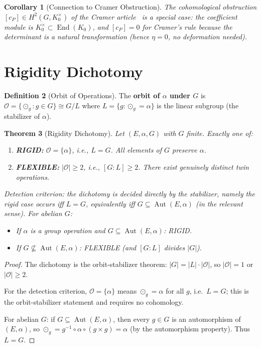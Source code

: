 \documentclass[11pt,twocolumn]{article}
\theoremstyle{plain}\newtheorem{theorem}{Theorem}\newtheorem{proposition}[theorem]{Proposition}\newtheorem{corollary}[theorem]{Corollary}\newtheorem{lemma}[theorem]{Lemma}
\theoremstyle{definition}\newtheorem{definition}[theorem]{Definition}\newtheorem{example}[theorem]{Example}
\theoremstyle{remark}\newtheorem{remark}[theorem]{Remark}
\newcommand{\Aut}{\operatorname{Aut}}
\newcommand{\End}{\operatorname{End}}
\begin{document}
\begin{corollary}[Connection to Cramer Obstruction]
The cohomological obstruction $[c_P] \in H^2(G, K_0^\times)$ of the Cramer article~\cite{nembe2026cramer} is a special case: the coefficient module is $K_0^\times \subset \End(K_0)$, and $[c_P] = 0$ for Cramer's rule because the determinant is a natural transformation (hence $\eta = 0$, no deformation needed).
\end{corollary}


\section{Rigidity Dichotomy}
\label{sec:rigidity}

\begin{definition}[Orbit of Operations]\label{def:orbit-ops}
The \textbf{orbit of $\alpha$ under $G$} is $\mathcal{O} = \{\odot_g : g \in G\} \cong G/L$ where $L = \{g : \odot_g = \alpha\}$ is the linear subgroup (the stabilizer of $\alpha$).
\end{definition}

\begin{theorem}[Rigidity Dichotomy]\label{thm:rigidity}
Let $(E, \alpha, G)$ with $G$ finite. Exactly one of:
\begin{enumerate}[label=(\alph*)]
    \item \textbf{RIGID:} $\mathcal{O} = \{\alpha\}$, i.e., $L = G$. All elements of $G$ preserve $\alpha$.
    \item \textbf{FLEXIBLE:} $|\mathcal{O}| \geq 2$, i.e., $[G:L] \geq 2$. There exist genuinely distinct twin operations.
\end{enumerate}

Detection criterion: the dichotomy is decided directly by the stabilizer, namely the rigid case occurs iff $L = G$, equivalently iff $G \subseteq \Aut(E,\alpha)$ (in the relevant sense). For abelian $G$:
\begin{itemize}
    \item If $\alpha$ is a group operation and $G \subseteq \Aut(E, \alpha)$: RIGID.
    \item If $G \not\subseteq \Aut(E, \alpha)$: FLEXIBLE (and $[G:L]$ divides $|G|$).
\end{itemize}
\end{theorem}

\begin{proof}
The dichotomy is the orbit-stabilizer theorem: $|G| = |L| \cdot |\mathcal{O}|$, so $|\mathcal{O}| = 1$ or $|\mathcal{O}| \geq 2$.

For the detection criterion, $\mathcal{O} = \{\alpha\}$ means $\odot_g = \alpha$ for all $g$, i.e.\ $L = G$; this is the orbit-stabilizer statement and requires no cohomology.

For abelian $G$: if $G \subseteq \Aut(E, \alpha)$, then every $g \in G$ is an automorphism of $(E, \alpha)$, so $\odot_g = g^{-1} \circ \alpha \circ (g \times g) = \alpha$ (by the automorphism property). Thus $L = G$.
\end{proof}
\end{document}
